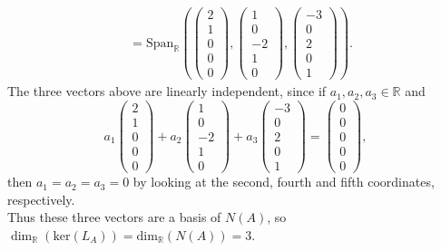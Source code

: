 \documentclass[
  12pt,
  a4paper,
  twoside]{article}
\theoremstyle{plain}
\theoremstyle{definition}
\begin{document}
\begin{align*}
&=\mathrm{Span}_{\mathbb{R}}\left(\begin{pmatrix}2\\1\\0\\0\\0\end{pmatrix}, \begin{pmatrix} 1\\0\\-2\\1\\0 \end{pmatrix}, \begin{pmatrix} -3\\0\\2\\0\\1\end{pmatrix}\right).
\end{align*}
The three vectors above are linearly independent, since if \(a_1,a_2,a_3\in\mathbb{R}\) and
\[
a_1\begin{pmatrix}2\\1\\0\\0\\0\end{pmatrix} + a_2\begin{pmatrix} 1\\0\\-2\\1\\0 \end{pmatrix} + a_3\begin{pmatrix} -3\\0\\2\\0\\1\end{pmatrix} = \begin{pmatrix}0\\0\\0\\0\\0\end{pmatrix},
\]
then \(a_1=a_2=a_3=0\) by looking at the second, fourth and fifth coordinates, respectively.\\
Thus these three vectors are a basis of \(N(A)\), so \(\dim_{\mathbb{R}}(\mathrm{ker}(L_A))=\mathrm{dim}_{\mathbb{R}}(N(A))=3\).
\end{document}
